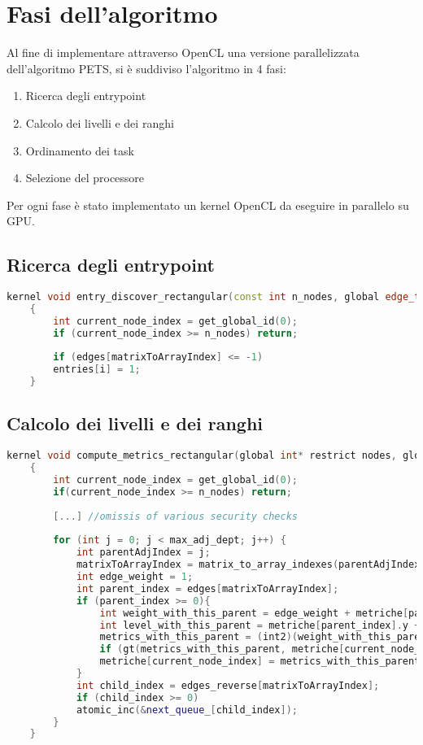 \section{Fasi dell'algoritmo}
Al fine di implementare attraverso OpenCL una versione parallelizzata dell'algoritmo PETS, si è suddiviso l'algoritmo in 4 fasi:

\begin{enumerate}
	\item Ricerca degli entrypoint
	\item Calcolo dei livelli e dei ranghi
	\item Ordinamento dei task
	\item Selezione del processore
\end{enumerate}


Per ogni fase è stato implementato un kernel OpenCL da eseguire in parallelo su GPU.

\subsection{Ricerca degli entrypoint}
\begin{lstlisting}[language=C++, caption={Find entrypoints kernel II},captionpos=b]
	kernel void entry_discover_rectangular(const int n_nodes, global edge_t* restrict edges, volatile global int* n_entries, global int* entries)
	{
		int current_node_index = get_global_id(0);
		if (current_node_index >= n_nodes) return;
		
		if (edges[matrixToArrayIndex] <= -1)
		entries[i] = 1;
	}
\end{lstlisting}

\subsection{Calcolo dei livelli e dei ranghi}
\begin{lstlisting}[language=C++, caption={Compute metrics kernel II},captionpos=b]
	kernel void compute_metrics_rectangular(global int* restrict nodes, global int* queue_, global int* next_queue_, const int n_nodes, global edge_t* restrict edges, global edge_t* restrict edges_reverse, volatile global int2* metriche, const int max_adj_dept)
	{
		int current_node_index = get_global_id(0);
		if(current_node_index >= n_nodes) return;
		
		[...] //omissis of various security checks
		
		for (int j = 0; j < max_adj_dept; j++) {
			int parentAdjIndex = j;
			matrixToArrayIndex = matrix_to_array_indexes(parentAdjIndex, current_node_index, n_nodes);
			int edge_weight = 1;
			int parent_index = edges[matrixToArrayIndex];
			if (parent_index >= 0){
				int weight_with_this_parent = edge_weight + metriche[parent_index].x + nodes[current_node_index];
				int level_with_this_parent = metriche[parent_index].y + 1;
				metrics_with_this_parent = (int2)(weight_with_this_parent, level_with_this_parent);
				if (gt(metrics_with_this_parent, metriche[current_node_index]))
				metriche[current_node_index] = metrics_with_this_parent;
			}
			int child_index = edges_reverse[matrixToArrayIndex];
			if (child_index >= 0)
			atomic_inc(&next_queue_[child_index]);
		}
	}
\end{lstlisting}


